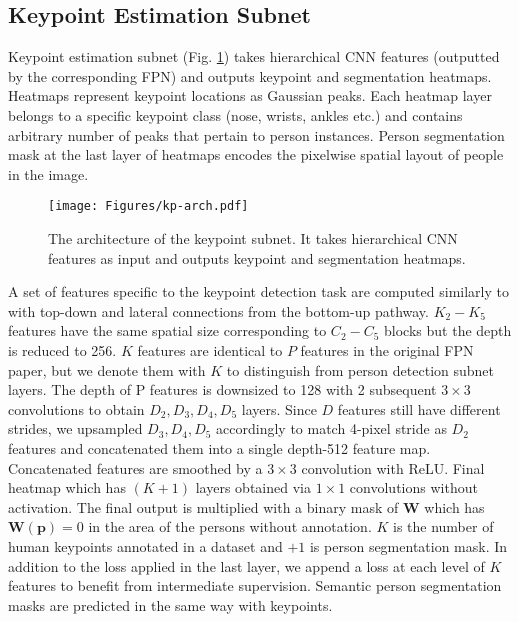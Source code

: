 \documentclass[runningheads]{llncs}
\begin{document}
\subsection{Keypoint Estimation Subnet}
\label{sec:kp}
Keypoint estimation subnet (Fig. \ref{fig:kp-arch}) takes hierarchical CNN features (outputted by the corresponding FPN) and outputs keypoint and segmentation heatmaps. Heatmaps represent keypoint locations as Gaussian peaks. Each heatmap layer belongs to a specific keypoint class (nose, wrists, ankles etc.) and contains arbitrary number of peaks that pertain to person instances. Person segmentation mask at the last layer of heatmaps encodes the pixelwise spatial layout of people in the image.




\begin{figure}
\centering
\texttt{[image: Figures/kp-arch.pdf]}
\caption{The architecture of the keypoint subnet. It takes hierarchical CNN features as input and outputs keypoint and segmentation heatmaps.}
\label{fig:kp-arch}
\end{figure}




A set of features specific to the keypoint detection task are computed similarly to \cite{Lina} with top-down and lateral connections from the bottom-up pathway. $K_2 - K_5$ features have the same spatial size corresponding to $C_2 - C_5$ blocks but the depth is reduced to 256. $K$ features are identical to $P$ features in the original FPN paper, but we denote them with  $K$ to distinguish from person detection subnet layers. The depth of P features is downsized to 128 with 2 subsequent $3 \times 3$ convolutions to obtain $D_2, D_3, D_4, D_5$ layers. Since $D$ features still have different strides, we upsampled $D_3, D_4, D_5$ accordingly to match 4-pixel stride as $D_2$ features and concatenated them into a single depth-512 feature map. Concatenated features are smoothed by a $3 \times 3$ convolution with ReLU. Final heatmap which has $(K+1)$ layers obtained via $1 \times 1$ convolutions without activation. The final output is multiplied with a binary mask of $\mathbf{W}$ which has $\mathbf{W}(\mathbf{p})=0$ in the area of the persons without annotation. $K$ is the number of human keypoints annotated in a dataset and $+1$ is person segmentation mask. In addition to the loss applied in the last layer, we append a loss at each level of $K$ features to benefit from intermediate supervision. Semantic person segmentation masks are predicted in the same way with keypoints.
\end{document}
